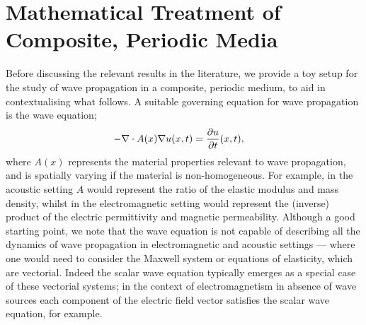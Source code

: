 \section{Mathematical Treatment of Composite, Periodic Media} \label{sec:MathHomLR}

Before discussing the relevant results in the literature, we provide a toy setup for the study of wave propagation in a composite, periodic medium, to aid in contextualising what follows.
A suitable governing equation for wave propagation is the wave equation;
\begin{align*}
	-\nabla\cdot A(x)\nabla u(x,t) &= \dfrac{\partial u}{\partial t}(x,t),
\end{align*}
where $A(x)$ represents the material properties relevant to wave propagation, and is spatially varying if the material is non-homogeneous.
For example, in the acoustic setting $A$ would represent the ratio of the elastic modulus and mass density, whilst in the electromagnetic setting would represent the (inverse) product of the electric permittivity and magnetic permeability.
Although a good starting point, we note that the wave equation is not capable of describing all the dynamics of wave propagation in electromagnetic and acoustic settings --- where one would need to consider the Maxwell system or equations of elasticity, which are vectorial.
Indeed the scalar wave equation typically emerges as a special case of these vectorial systems; in the context of electromagnetism in absence of wave sources each component of the electric field vector satisfies the scalar wave equation, for example.

